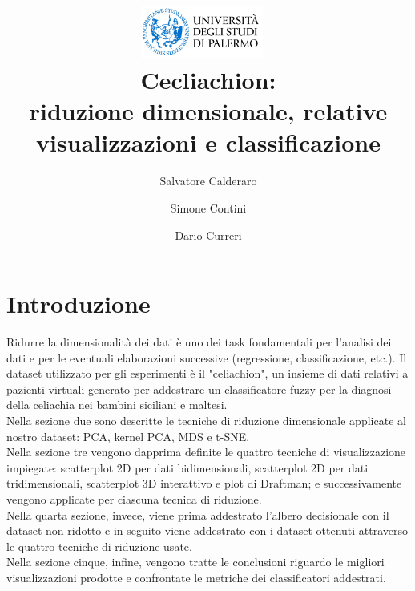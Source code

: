 \documentclass[11pt,a4paper,twocolumn]{article}
\author{Salvatore Calderaro \and Simone Contini \and Dario Curreri}
\title{%
\includegraphics[width=0.3\textwidth]{img/unipa.jpg}{\centering}~
\\
Cecliachion:\\
riduzione dimensionale, relative visualizzazioni e classificazione
}
\begin{document}
\date{}
\section{Introduzione}
Ridurre la dimensionalità dei dati è uno dei task fondamentali per l'analisi dei dati e per le eventuali elaborazioni successive (regressione, classificazione, etc.). Il dataset utilizzato per gli esperimenti è il "celiachion", un insieme di dati relativi a pazienti virtuali generato per addestrare un classificatore fuzzy per la diagnosi della celiachia nei bambini siciliani e maltesi.\\ 
Nella sezione due sono descritte le tecniche di riduzione dimensionale applicate al nostro dataset: PCA, kernel PCA, MDS e t-SNE.\\
Nella sezione tre vengono dapprima definite le quattro tecniche di visualizzazione impiegate: scatterplot 2D per dati bidimensionali, scatterplot 2D per dati tridimensionali, scatterplot 3D interattivo e plot di Draftman; e successivamente vengono applicate per ciascuna tecnica di riduzione. \\
Nella quarta sezione, invece, viene prima addestrato l'albero decisionale con il  dataset non ridotto e in seguito viene addestrato con i dataset ottenuti attraverso le quattro tecniche di riduzione usate.\\ Nella sezione cinque, infine, vengono tratte le conclusioni riguardo le migliori visualizzazioni prodotte e confrontate le metriche dei classificatori addestrati.
\end{document}
